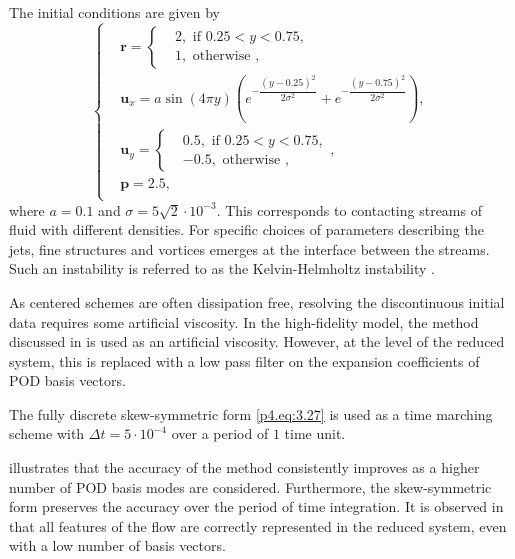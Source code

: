 The initial conditions are given by
\begin{equation*}
\begin{cases}
& \mathbf{r} = 
\begin{cases}
& 2, \text{ if } 0.25<y<0.75,\\
& 1, \text{ otherwise },
\end{cases}
\\
& \mathbf{u}_x = a \sin(4\pi y) \left( e^{-\dfrac{(y-0.25)^2}{2\sigma^2}} + e^{-\dfrac{(y-0.75)^2}{2\sigma^2}} \right),\\
& \mathbf{u}_y = 
\begin{cases}
& 0.5, \text{ if } 0.25<y<0.75,\\
& -0.5, \text{ otherwise },
\end{cases},
\\
& \mathbf{p} = 2.5,\\
\end{cases}
\end{equation*}
where $a=0.1$ and $\sigma=5\sqrt{2}\cdot 10^{-3}$. This corresponds to contacting streams of fluid with different densities. For specific choices of parameters describing the jets, fine structures and vortices emerges at the interface between the streams. Such an instability is referred to as the Kelvin-Helmholtz instability \cite{HHS}.

As centered schemes are often dissipation free, resolving the discontinuous initial data requires some artificial viscosity. In the high-fidelity model, the method discussed in \cite{artificial_dissipation} is used as an artificial viscosity. However, at the level of the reduced system, this is replaced with a low pass filter on the expansion coefficients of POD basis vectors.

The fully discrete skew-symmetric form \eqref{p4.eq:3.27} is used as a time marching scheme with $\Delta t = 5 \cdot 10^{-4}$ over a period of $1$ time unit.

 illustrates that the accuracy of the method consistently improves as a higher number of POD basis modes are considered. Furthermore, the skew-symmetric form preserves the accuracy over the period of time integration. It is observed in  that all features of the flow are correctly represented in the reduced system, even with a low number of basis vectors.

